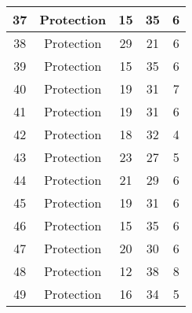 \documentclass[results.tex]{subfiles}
\begin{document}
\begin{center}
\begin{tabular}{| c || c | c | c | c |}
            \hline
            37                      & Protection                   & 15                     & 35                      & 6                    \\
            \hline
            38                      & Protection                   & 29                     & 21                      & 6                    \\
            \hline
            39                      & Protection                   & 15                     & 35                      & 6                    \\
            \hline
            40                      & Protection                   & 19                     & 31                      & 7                    \\
            \hline
            41                      & Protection                   & 19                     & 31                      & 6                    \\
            \hline
            42                      & Protection                   & 18                     & 32                      & 4                    \\
            \hline
            43                      & Protection                   & 23                     & 27                      & 5                    \\
            \hline
            44                      & Protection                   & 21                     & 29                      & 6                    \\
            \hline
            45                      & Protection                   & 19                     & 31                      & 6                    \\
            \hline
            46                      & Protection                   & 15                     & 35                      & 6                    \\
            \hline
            47                      & Protection                   & 20                     & 30                      & 6                    \\
            \hline
            48                      & Protection                   & 12                     & 38                      & 8                    \\
            \hline
            49                      & Protection                   & 16                     & 34                      & 5                    \\
            \hline
        \end{tabular}
    \end{center}
\end{document}
